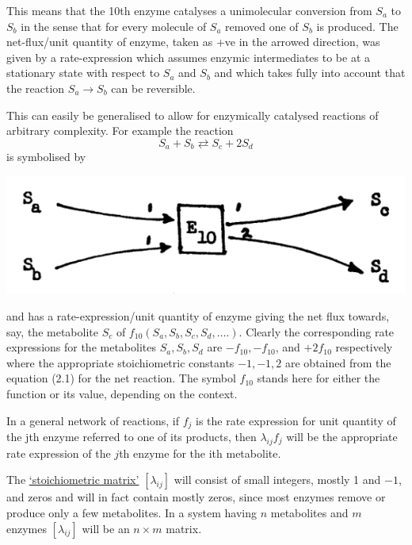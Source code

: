 This means that the 10th enzyme catalyses a unimolecular conversion from $S_{a}$ to $S_{b}$ in the sense that for every molecule of $S_{a}$ removed one of $S_{b}$ is produced. The net-flux/unit quantity of enzyme, taken as +ve in the arrowed direction, was given by a rate-expression which assumes enzymic intermediates to be at a stationary state with respect to $S_{a}$ and $S_{b}$ and which takes fully into account that the reaction $S_{a} \longrightarrow S_{b}$ can be reversible.

This can easily be generalised to allow for enzymically catalysed reactions of arbitrary complexity. For example the reaction
%
\begin{equation}
S_a + S_b \rightleftarrows S_c + 2 S_d
\label{eqn:21}
\end{equation}
%
is symbolised by

\centerline{\includegraphics[scale=0.65]{figure2_E10.png}}

and has a rate-expression/unit quantity of enzyme giving the net flux towards, say, the metabolite $S_{c}$ of $f_{10}\left(S_{a}, S_{b}, S_{c}, S_{d}, \ldots.\right)$. Clearly the corresponding rate expressions for the metabolites $S_{a}, S_{b}, S_{d}$ are $-f_{10},-f_{10}$, and $+2 f_{10}$ respectively where the appropriate stoichiometric constants $-1,-1,2$ are obtained from the equation (2.1) for the net reaction. The symbol $f_{10}$ stands here for either the function or its value, depending on the context.

In a general network of reactions, if $f_j$ is the rate expression for unit quantity of the jth enzyme referred to one of its products, then $\lambda_{ij} f_j$ will be the appropriate rate expression of the $j$th enzyme for the ith metabolite.

The \underline{`stoichiometric matrix'} $\left[\lambda_{ij}\right]$ will consist of small integers, mostly 1 and $-1$, and zeros and will in fact contain mostly zeros, since most enzymes remove or produce only a few metabolites. In a system having $n$ metabolites and $m$ enzymes $\left[\lambda_{i j}\right]$ will be an $n \times m$ matrix.

